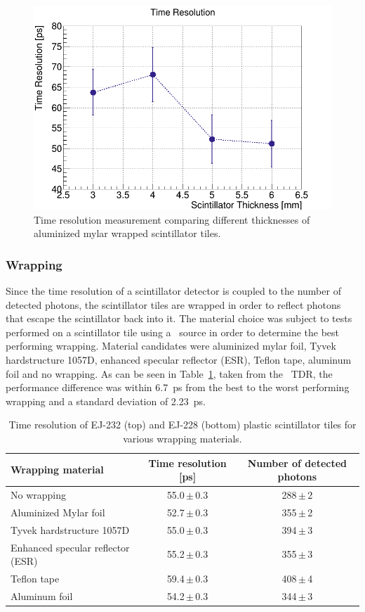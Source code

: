 \documentclass[../BTOF_summary.tex]{subfiles}
\begin{document}
\begin{figure}[htbp]
	\centering
	\includegraphics[width=.7\textwidth]{fig/TimeResSummary.png}
	\caption{Time resolution measurement comparing different thicknesses of aluminized mylar wrapped scintillator tiles.}
	\label{fig:Tchickness_timeRes}
\end{figure}

\subsubsection*{Wrapping}
Since the time resolution of a scintillator detector is coupled to the number of detected photons, the scintillator tiles are wrapped in order to reflect photons that escape the scintillator back into it.
The material choice was subject to tests performed on a scintillator tile using a \sr\ source in order to determine the best performing wrapping.
Material candidates were aluminized mylar foil, Tyvek hardstructure 1057D, enhanced specular reflector (ESR), Teflon tape, aluminum foil and no wrapping.
As can be seen in Table~\ref{tab:WrappingTest}, taken from the \btof\ TDR, the performance difference was within \SI{6.7}{ps} from the best to the worst performing wrapping and a standard deviation of \SI{2.23}{ps}.

\begin{table}[htbp]
	\caption[Time resolution for different wrapping materials]{Time resolution of EJ-232 (top) and EJ-228 (bottom) plastic scintillator tiles for various wrapping materials.
		\label{tab:WrappingTest}}
	\centering
	{
		\begin{tabular}{ l  c  c }
			\toprule
			Wrapping material                 & Time resolution [ps] & Number of detected photons \\
			\midrule
			No wrapping                       & 55.0\,$\pm$\,0.3     & 288\,$\pm$\,2\\
			Aluminized Mylar foil             & 52.7\,$\pm$\,0.3     & 355\,$\pm$\,2\\
			Tyvek hardstructure 1057D         & 55.0\,$\pm$\,0.3     & 394\,$\pm$\,3\\
			Enhanced specular reflector (ESR) & 55.2\,$\pm$\,0.3     & 355\,$\pm$\,3\\
			Teflon tape                       & 59.4\,$\pm$\,0.3     & 408\,$\pm$\,4\\
			Aluminum foil                     & 54.2\,$\pm$\,0.3     & 344\,$\pm$\,3\\
			\midrule
		\end{tabular}
	}
\end{table}
\end{document}
